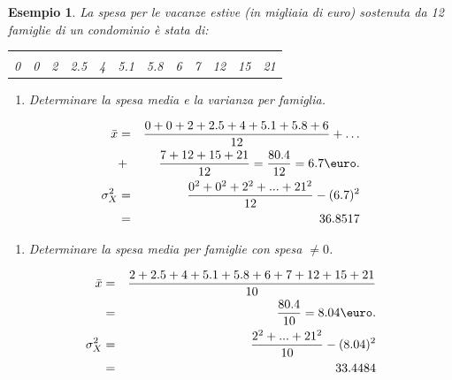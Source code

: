 \documentclass[
  11pt,
]{book}
\providecommand{\tightlist}{%
  \setlength{\itemsep}{0pt}\setlength{\parskip}{0pt}}
\theoremstyle{mytheoremstyle}
\theoremstyle{mydefstyle}
\newtheorem{example}{{Esempio}}[section]
\begin{document}
\begin{example}
La spesa per le vacanze estive (in migliaia di euro) sostenuta
da 12 famiglie di un condominio è stata di:

\begin{tabbing}
\begin{tabular}{cccccccccccc}
\hline\\
0 &0 &2 &2.5 &4 &5.1 &5.8 &6 &7 &12 &15 &21 \\
\hline
\end{tabular}
\end{tabbing}

\begin{enumerate}
\def\labelenumi{(\alph{enumi})}
\tightlist
\item
  Determinare la spesa media e la varianza per famiglia.
\end{enumerate}

\begin{eqnarray*}
    \bar{x}
&=& \frac{0 +0 + 2+ 2.5 +4 +5.1 +5.8 +6} {12} + \ldots \\
&+& \frac{7 +12 +15 +21} {12}
 =  \frac{80.4} {12} = 6.7 \mbox{\euro}. \\
 \sigma_X^2 &=& \frac{0^2+0^2+2^2+...+21^2}{12}-(6.7)^2\\
 &=& 36.8517
\end{eqnarray*}

\begin{enumerate}
\def\labelenumi{(\alph{enumi})}
\setcounter{enumi}{1}
\tightlist
\item
  Determinare la spesa media per famiglie con spesa \(\ne 0\).
\end{enumerate}

\begin{eqnarray*}
    \bar{x}
&=& \frac{2+ 2.5 +4 +5.1 +5.8 +6 +7 +12 +15 +21} {10} \\
&=& \frac{80.4} {10} = 8.04 \mbox{\euro}.\\
 \sigma_{X}^2 &=& \frac{2^2+...+21^2}{10}-(8.04)^2\\
 &=& 33.4484
\end{eqnarray*}
\end{example}
\end{document}
